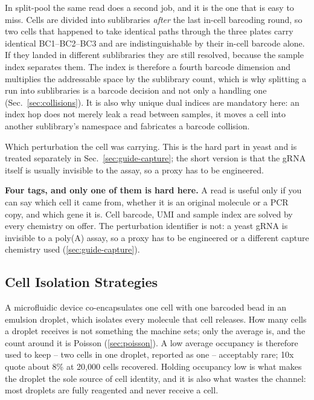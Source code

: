 In split-pool the same read does a second job, and it is the one that is easy to
miss. Cells are divided into sublibraries \emph{after} the last in-cell
barcoding round, so two cells that happened to take identical paths through the
three plates carry identical BC1--BC2--BC3 and are indistinguishable by their
in-cell barcode alone. If they landed in different sublibraries they are still
resolved, because the sample index separates them. The index is therefore a
fourth barcode dimension and multiplies the addressable space by the sublibrary
count, which is why splitting a run into sublibraries is a barcode decision and
not only a handling one (Sec.~\ref{sec:collisions}). It is also why unique dual
indices are mandatory here: an index hop does not merely leak a read between
samples, it moves a cell into another sublibrary's namespace and fabricates a
barcode collision.

 Which perturbation the cell was carrying. This
is the hard part in yeast and is treated separately in
Sec.~\ref{sec:guide-capture}; the short version is that the gRNA itself is
usually invisible to the assay, so a proxy has to be engineered.

\begin{keybox}
\textbf{Four tags, and only one of them is hard here.} A read is useful only if
you can say which cell it came from, whether it is an original molecule or a PCR
copy, and which gene it is. Cell barcode, UMI and sample index are solved by
every chemistry on offer. The perturbation identifier is not: a yeast gRNA is
invisible to a poly(A) assay, so a proxy has to be engineered or a different
capture chemistry used (\cref{sec:guide-capture}).
\end{keybox}

\subsection{Cell Isolation Strategies}
\label{sec:isolation}

 A microfluidic device co-encapsulates one
cell with one barcoded bead in an emulsion droplet, which isolates every molecule
that cell releases. How many cells a droplet receives is not something the
machine sets; only the average is, and the count around it is Poisson
(\cref{sec:poisson}). A low average occupancy is therefore used to keep
 -- two cells in one droplet, reported as one -- acceptably rare;
10x quote about 8\% at 20{,}000 cells recovered. Holding occupancy low is what
makes the droplet the sole source of cell identity, and it is also what wastes
the channel: most droplets are fully reagented and never receive a cell.

